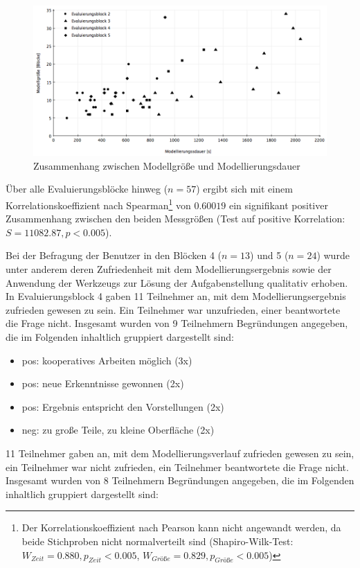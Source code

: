 \begin{figure}[htbp]
	\centering
		\includegraphics[width=15cm]{img/Evaluierung/correlation.png}
	\caption{Zusammenhang zwischen Modellgröße und Modellierungsdauer}
	\label{fig:img_Evaluierung_correlation}
\end{figure}

Über alle Evaluierungsblöcke hinweg ($n=57$) ergibt sich mit einem Korrelationskoeffizient nach Spearman\footnote{Der Korrelationskoeffizient nach Pearson kann nicht angewandt werden, da beide Stichproben nicht normalverteilt sind (Shapiro-Wilk-Test: $W_{Zeit}=0.880, p_{Zeit}<0.005$, $W_{Größe}=0.829, p_{Größe}<0.005$)} von $0.60019$ ein signifikant positiver Zusammenhang zwischen den beiden Messgrößen (Test auf positive Korrelation: $S=11082.87, p<0.005$).

Bei der Befragung der Benutzer in den Blöcken 4 ($n=13$) und 5 ($n=24$) wurde unter anderem deren Zufriedenheit mit dem Modellierungsergebnis sowie der Anwendung der Werkzeugs zur Lösung der Aufgabenstellung qualitativ erhoben. In Evaluierungsblock 4 gaben 11 Teilnehmer an, mit dem Modellierungsergebnis zufrieden gewesen zu sein. Ein Teilnehmer war unzufrieden, einer beantwortete die Frage nicht. Insgesamt wurden von 9 Teilnehmern Begründungen angegeben, die im Folgenden inhaltlich gruppiert dargestellt sind:

\begin{itemize}
	\item pos: kooperatives Arbeiten möglich (3x)
	\item pos: neue Erkenntnisse gewonnen (2x)
	\item pos: Ergebnis entspricht den Vorstellungen (2x)
	\item neg: zu große Teile, zu kleine Oberfläche (2x)
\end{itemize}

11 Teilnehmer gaben an, mit dem Modellierungsverlauf zufrieden gewesen zu sein, ein Teilnehmer war nicht zufrieden, ein Teilnehmer beantwortete die Frage nicht. Insgesamt wurden von 8 Teilnehmern Begründungen angegeben, die im Folgenden inhaltlich gruppiert dargestellt sind:

